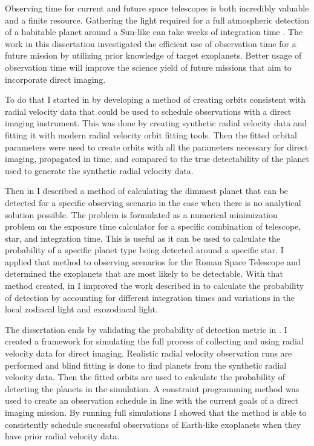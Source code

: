 Observing time for current and future space telescopes is both incredibly
valuable and a finite resource. Gathering the light required for a full
atmospheric detection of a habitable planet around a Sun-like can take weeks of
integration time \citep{TheLUVOIRTeam2019}. The work in this dissertation
investigated the efficient use of observation time for a future mission by
utilizing prior knowledge of target exoplanets. Better usage of observation
time will improve the science yield of future missions that aim to incorporate
direct imaging.

To do that I started in  by developing a method of
creating orbits consistent with radial velocity data that could be used to
schedule observations with a direct imaging instrument. This was done by
creating synthetic radial velocity data and fitting it with modern radial
velocity orbit fitting tools. Then the fitted orbital parameters were used to
create orbits with all the parameters necessary for direct imaging, propagated
in time, and compared to the true detectability of the planet used to generate
the synthetic radial velocity data.

Then in  I described a method of calculating the dimmest
planet that can be detected for a specific observing scenario in the case when
there is no analytical solution possible. The problem is formulated as a
numerical minimization problem on the exposure time calculator for a specific
combination of telescope, star, and integration time. This is useful as it can
be used to calculate the probability of a specific planet type being detected
around a specific star. I applied that method to observing scenarios for the
Roman Space Telescope and determined the exoplanets that are most likely to be
detectable. With that method created, in  I improved
the work described in  to calculate the probability of
detection by accounting for different integration times and variations in the
local zodiacal light and exozodiacal light.

The dissertation ends by validating the probability of detection metric in
. I created a framework for simulating the full
process of collecting and using radial velocity data for direct imaging.
Realistic radial velocity observation runs are performed and blind fitting is
done to find planets from the synthetic radial velocity data. Then the fitted
orbits are used to calculate the probability of detecting the planets in the
simulation. A constraint programming method was used to create an observation
schedule in line with the current goals of a direct imaging mission. By running
full simulations I showed that the method is able to consistently schedule
successful observations of Earth-like exoplanets when they have prior radial
velocity data.

